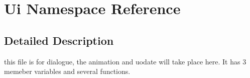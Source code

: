\hypertarget{namespace_ui}{}\section{Ui Namespace Reference}
\label{namespace_ui}


\subsection{Detailed Description}
this file is for dialogue, the animation and uodate will take place here. It has 3 memeber variables and several functions. 